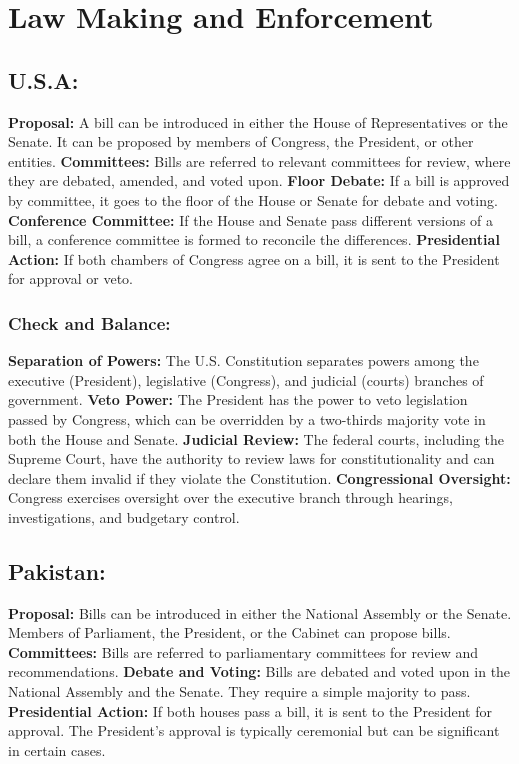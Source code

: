 \documentclass{article}
\begin{document}
\section {Law Making and Enforcement}
\subsection{U.S.A:}
\textbf{Proposal:} A bill can be introduced in either the House of Representatives or the Senate. It can be proposed by members of Congress, the President, or other entities.
\newline
\textbf{Committees:} Bills are referred to relevant committees for review, where they are debated, amended, and voted upon.
\newline
\textbf{Floor Debate:} If a bill is approved by committee, it goes to the floor of the House or Senate for debate and voting.
\newline
\textbf{Conference Committee:} If the House and Senate pass different versions of a bill, a conference committee is formed to reconcile the differences.
\newline
\textbf{Presidential Action:} If both chambers of Congress agree on a bill, it is sent to the President for approval or veto.

\subsubsection{Check and Balance:}
\textbf{Separation of Powers:} The U.S. Constitution separates powers among the executive (President), legislative (Congress), and judicial (courts) branches of government.
\newline
\textbf{Veto Power:} The President has the power to veto legislation passed by Congress, which can be overridden by a two-thirds majority vote in both the House and Senate.
\newline
\textbf{Judicial Review:} The federal courts, including the Supreme Court, have the authority to review laws for constitutionality and can declare them invalid if they violate the Constitution.
\newline
\textbf{Congressional Oversight:} Congress exercises oversight over the executive branch through hearings, investigations, and budgetary control.

\subsection{Pakistan:}
\textbf{Proposal:} Bills can be introduced in either the National Assembly or the Senate. Members of Parliament, the President, or the Cabinet can propose bills.
\newline 
\textbf{Committees:} Bills are referred to parliamentary committees for review and recommendations.
\newline
\textbf{Debate and Voting:} Bills are debated and voted upon in the National Assembly and the Senate. They require a simple majority to pass.
\newline
\textbf{Presidential Action:} If both houses pass a bill, it is sent to the President for approval. The President's approval is typically ceremonial but can be significant in certain cases.
\end{document}
